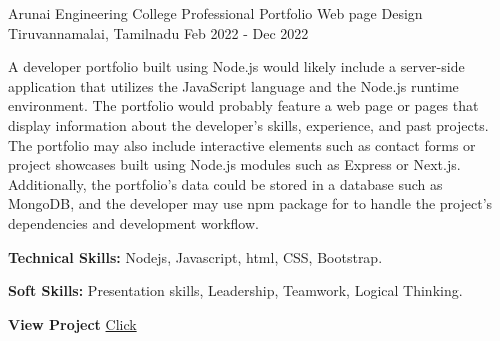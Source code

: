 \begin{cventries}
  \cventry
    {Arunai Engineering College} %
    {Professional Portfolio Web page Design} %
    {Tiruvannamalai, Tamilnadu} %
    {Feb 2022 - Dec 2022} %
    {
      \begin{cvitems} %
        \item {A developer portfolio built using Node.js would likely include a server-side application that utilizes the JavaScript language and the Node.js runtime environment. The portfolio would probably feature a web page or pages that display information about the developer's skills, experience, and past projects. The portfolio may also include interactive elements such as contact forms or project showcases built using Node.js modules such as Express or Next.js. Additionally, the portfolio's data could be stored in a database such as MongoDB, and the developer may use npm package for to handle the project's dependencies and development workflow.}
       \item {\textbf{Technical Skills:} Nodejs, Javascript, html, CSS, Bootstrap.}
        \item {\textbf{Soft Skills:} Presentation skills, Leadership, Teamwork, Logical Thinking.}
           \item {\textbf{View Project} \href{https://ajicreations.netlify.app/} {Click} }
      \end{cvitems}
    }

 

\end{cventries}
